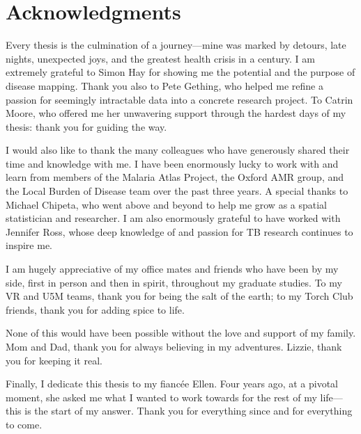 \documentclass[
]{report}
\begin{document}
\hypertarget{acknowledgments}{%
\chapter*{Acknowledgments}\label{acknowledgments}}

\begin{spacing}{1.15}

Every thesis is the culmination of a journey---mine was marked by detours, late nights, unexpected joys, and the greatest health crisis in a century. I am extremely grateful to Simon Hay for showing me the potential and the purpose of disease mapping. Thank you also to Pete Gething, who helped me refine a passion for seemingly intractable data into a concrete research project. To Catrin Moore, who offered me her unwavering support through the hardest days of my thesis: thank you for guiding the way.

I would also like to thank the many colleagues who have generously shared their time and knowledge with me. I have been enormously lucky to work with and learn from members of the Malaria Atlas Project, the Oxford AMR group, and the Local Burden of Disease team over the past three years. A special thanks to Michael Chipeta, who went above and beyond to help me grow as a spatial statistician and researcher. I am also enormously grateful to have worked with Jennifer Ross, whose deep knowledge of and passion for TB research continues to inspire me.

I am hugely appreciative of my office mates and friends who have been by my side, first in person and then in spirit, throughout my graduate studies. To my VR and U5M teams, thank you for being the salt of the earth; to my Torch Club friends, thank you for adding spice to life.

None of this would have been possible without the love and support of my family. Mom and Dad, thank you for always believing in my adventures. Lizzie, thank you for keeping it real.

Finally, I dedicate this thesis to my fiancée Ellen. Four years ago, at a pivotal moment, she asked me what I wanted to work towards for the rest of my life---this is the start of my answer. Thank you for everything since and for everything to come.


\setcounter{tocdepth}{3}
\tableofcontents
{}

\listoffigures
{}


\listoftables
{}
\end{spacing}
\end{document}
